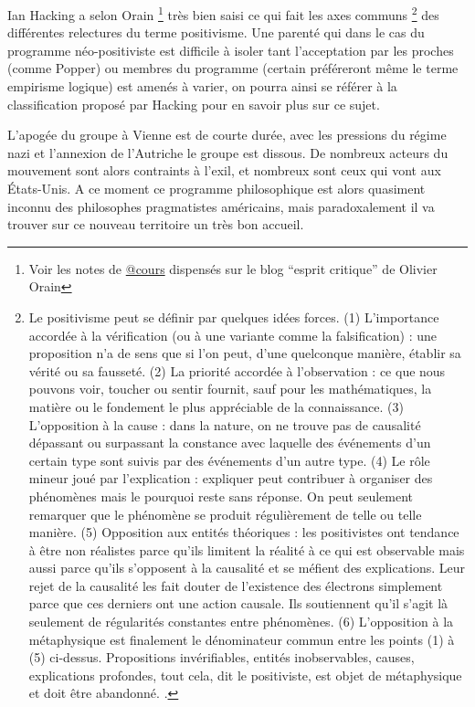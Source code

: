 Ian Hacking \autocite{Hacking1983} a selon Orain \footnote{Voir les notes de \href{http://www.esprit-critique.net/article-12642840.html}{@cours} dispensés sur le blog \enquote{esprit critique} de Olivier Orain} très bien saisi ce qui fait les axes communs \footnote{Le positivisme peut se définir par quelques idées forces. (1) L’importance accordée à la vérification (ou à une variante comme la falsification) : une proposition n’a de sens que si l’on peut, d’une quelconque manière, établir sa vérité ou sa fausseté. (2) La priorité accordée à l’observation : ce que nous pouvons voir, toucher ou sentir fournit, sauf pour les mathématiques, la matière ou le fondement le plus appréciable de la connaissance. (3) L’opposition à la cause : dans la nature, on ne trouve pas de causalité dépassant ou surpassant la constance avec laquelle des événements d’un certain type sont suivis par des événements d’un autre type. (4) Le rôle mineur joué par l’explication : expliquer peut contribuer à organiser des phénomènes mais le pourquoi reste sans réponse. On peut seulement remarquer que le phénomène se produit régulièrement de telle ou telle manière. (5) Opposition aux entités théoriques : les positivistes ont tendance à être non réalistes parce qu’ils limitent la réalité à ce qui est observable mais aussi parce qu’ils s’opposent à la causalité et se méfient des explications. Leur rejet de la causalité les fait douter de l’existence des électrons simplement parce que ces derniers ont une action causale. Ils soutiennent qu’il s’agit là seulement de régularités constantes entre phénomènes. (6) L’opposition à la métaphysique est finalement le dénominateur commun entre les points (1) à (5) ci-dessus. Propositions invérifiables, entités inobservables, causes, explications profondes, tout cela, dit le positiviste, est objet de métaphysique et doit être abandonné. \autocite[82]{Hacking1983}.} des différentes relectures du terme positivisme. Une parenté qui dans le cas du programme néo-positiviste est difficile à isoler tant l'acceptation par les proches (comme Popper) ou membres du programme (certain préféreront même le terme empirisme logique) est amenés à varier, on pourra ainsi se référer à la classification proposé par Hacking pour en savoir plus sur ce sujet. \autocite[81-86]{Hacking1983}

L'apogée du groupe à Vienne est de courte durée, avec les pressions du régime nazi et l'annexion de l'Autriche le groupe est dissous. De nombreux acteurs du mouvement sont alors contraints à l'exil, et nombreux sont ceux qui vont aux États-Unis. A ce moment ce programme philosophique est alors quasiment inconnu des philosophes pragmatistes américains, mais paradoxalement il va trouver sur ce nouveau territoire un très bon accueil. 

